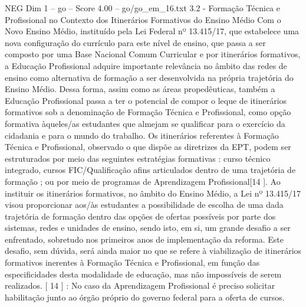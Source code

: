 \begin{textsample}{NEG Dim 1 – go – Score 4.00 – go/go\_em\_16.txt}  \label{ex:f1_neg_198}
3.2 - Formação Técnica e Profissional no Contexto dos Itinerários Formativos do Ensino Médio Com o Novo Ensino Médio, instituído pela Lei Federal nº 13.415/17, que estabelece uma nova configuração do currículo para este nível de ensino, que passa a ser composto por uma Base Nacional Comum Curricular e por itinerários formativos, a Educação Profissional adquire importante relevância no âmbito das redes de ensino como alternativa de formação a ser desenvolvida na própria trajetória do Ensino Médio.
Dessa forma, assim como as áreas propedêuticas, também a Educação Profissional passa a ter o potencial de compor o leque de itinerários formativos sob a denominação de Formação Técnica e Profissional, como opção formativa àqueles/as estudantes que almejam se qualificar para o exercício da cidadania e para o mundo do trabalho.
Os itinerários referentes à Formação Técnica e Profissional, observado o que dispõe as diretrizes da EPT, podem ser estruturados por meio das seguintes estratégias formativas : curso técnico integrado, cursos FIC/Qualificação afins articulados dentro de uma trajetória de formação ; ou por meio de programas de Aprendizagem Profissional[14 ].
Ao instituir os itinerários formativos, no âmbito do Ensino Médio, a Lei nº 13.415/17 visou proporcionar aos/às estudantes a possibilidade de escolha de uma dada trajetória de formação dentro das opções de ofertas possíveis por parte dos sistemas, redes e unidades de ensino, sendo isto, em si, um grande desafio a ser enfrentado, sobretudo nos primeiros anos de implementação da reforma.
Este desafio, sem dúvida, será ainda maior no que se refere à viabilização de itinerários formativos inerentes à Formação Técnica e Profissional, em função das especificidades desta modalidade de educação, mas não impossíveis de serem realizados. [ 14 ] : No caso da Aprendizagem Profissional é preciso solicitar habilitação junto ao órgão próprio do governo federal para a oferta de cursos.

\end{textsample}
